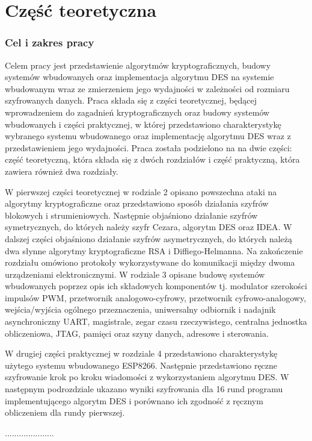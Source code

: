 \documentclass[12p]{article}
\begin{document}
\tableofcontents
\newpage
\part{Część teoretyczna}
\section{Cel i zakres pracy}


\quad Celem pracy jest przedstawienie algorytmów kryptograficznych, budowy systemów wbudowanych oraz implementacja algorytmu DES na systemie wbudowanym wraz ze zmierzeniem jego wydajności w zależności od rozmiaru szyfrowanych danych. Praca składa się z części teoretycznej, będącej wprowadzeniem do zagadnień kryptograficznych oraz budowy systemów wbudowanych i części praktycznej, w której przedstawiono charakterystykę wybranego systemu wbudowanego oraz implementację algorytmu DES wraz z przedstawieniem jego wydajności. Praca została podzielono na na dwie części: część teoretyczną, która składa się z dwóch rozdziałów i część praktyczną, która zawiera również dwa rozdziały. 

W pierwszej części teoretycznej w rodziale 2 opisano powszechna ataki na algorytmy kryptograficzne oraz przedstawiono sposób działania szyfrów blokowych i strumieniowych. Następnie objaśniono działanie szyfrów symetrycznych, do których należy szyfr Cezara, algorytm DES oraz IDEA. W dalszej części objaśniono działanie szyfrów asymetrycznych, do których należą dwa słynne algorytmy kryptograficzne RSA i Diffiego-Helmanna. Na zakończenie rozdziału   omówiono protokoły wykorzystywane do komunikacji między dwoma urządzeniami elektronicznymi. W rodziale 3 opisane budowę systemów wbudowanych poprzez opis ich składowych komponentów tj. modulator szerokości impulsów PWM, przetwornik analogowo-cyfrowy, przetwornik cyfrowo-analogowy, wejścia/wyjścia ogólnego przeznaczenia, uniwersalny odbiornik i nadajnik asynchroniczny UART, magistrale, zegar czasu rzeczywistego, centralna jednostka obliczeniowa, JTAG, pamięci oraz szyny danych, adresowe i sterowania. 

W drugiej części praktycznej w rozdziale 4 przedstawiono charakterystykę użytego systemu wbudowanego ESP8266. Następnie przedstawiono ręczne szyfrowanie krok po kroku wiadomości z wykorzystaniem algorytmu DES. W następnym podrozdziale ukazano wyniki szyfrowania dla 16 rund programu implementującego algorytm DES i porównano ich zgodność z ręcznym obliczeniem dla rundy pierwszej. 
 
 ..................... 
 
\end{document}
